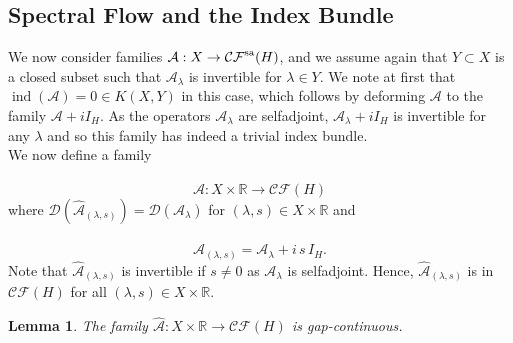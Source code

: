\documentclass[a4paper,10pt]{article}
\newtheorem{lemma}[theorem]{Lemma}
\DeclareMathOperator{\ind}{ind}
\begin{document}
\subsection{Spectral Flow and the Index Bundle}\label{section-sflbundle}
We now consider families $\mathcal{A}:X\rightarrow\mathcal{CF}^\textup{sa}(H)$, and we assume again that $Y\subset X$ is a closed subset such that $\mathcal{A}_\lambda$ is invertible for $\lambda\in Y$. We note at first that $\ind(\mathcal{A})=0\in K(X,Y)$ in this case, which follows by deforming $\mathcal{A}$ to the family $\mathcal{A}+iI_H$. As the operators $\mathcal{A}_\lambda$ are selfadjoint, $\mathcal{A}_\lambda+iI_H$ is invertible for any $\lambda$ and so this family has indeed a trivial index bundle.\\
We now define a family

\[\hat{\mathcal{A}}:X\times\mathbb{R}\rightarrow\mathcal{CF}(H)\]
where $\mathcal{D}(\hat{\mathcal{A}}_{(\lambda,s)})=\mathcal{D}(\mathcal{A}_\lambda)$ for $(\lambda,s)\in X\times\mathbb{R}$ and

\[\hat{\mathcal{A}}_{(\lambda,s)}=\mathcal{A}_\lambda+i\,s\,I_H.\]
Note that $\hat{\mathcal{A}}_{(\lambda,s)}$ is invertible if $s\neq 0$ as $\mathcal{A}_\lambda$ is selfadjoint. Hence, $\hat{\mathcal{A}}_{(\lambda,s)}$ is in $\mathcal{CF}(H)$ for all $(\lambda,s)\in X\times\mathbb{R}$. 

\begin{lemma}
The family $\hat{\mathcal{A}}:X\times\mathbb{R}\rightarrow\mathcal{CF}(H)$ is gap-continuous.
\end{lemma}
\end{document}
